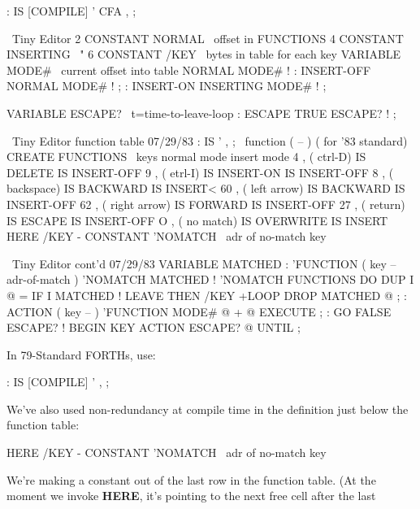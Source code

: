 \begin{Code}
: IS   [COMPILE] '  CFA , ;
\end{Code}
\begin{figure*}[pppp]
\setcounter{screen}{30}
\begin{Screen}
\ Tiny Editor
2 CONSTANT NORMAL     \ offset in FUNCTIONS
4 CONSTANT INSERTING  \        "
6 CONSTANT /KEY       \ bytes in table for each key
VARIABLE MODE#        \ current offset into table
NORMAL MODE# !
: INSERT-OFF   NORMAL    MODE# ! ;
: INSERT-ON    INSERTING MODE# ! ;

VARIABLE ESCAPE?      \ t=time-to-leave-loop
: ESCAPE  TRUE ESCAPE? ! ;
\end{Screen}
\begin{Screen}
\ Tiny Editor             function table             07/29/83
: IS   ' , ;  \   function   ( -- )    ( for '83 standard)
CREATE FUNCTIONS
\ keys                  normal mode        insert mode
 4 ,  ( ctrl-D)         IS DELETE          IS INSERT-OFF
 9 ,  ( etrl-I)         IS INSERT-ON       IS INSERT-OFF
 8 ,  ( backspace)      IS BACKWARD        IS INSERT<
60 ,  ( left arrow)     IS BACKWARD        IS INSERT-OFF
62 ,  ( right arrow)    IS FORWARD         IS INSERT-OFF
27 ,  ( return)         IS ESCAPE          IS INSERT-OFF
 O ,  ( no match)       IS OVERWRITE       IS INSERT
HERE /KEY -  CONSTANT 'NOMATCH  \ adr of no-match key
\end{Screen}
\begin{Screen}
\ Tiny Editor cont'd                                 07/29/83
VARIABLE MATCHED
: 'FUNCTION  ( key -- adr-of-match )  'NOMATCH  MATCHED !
   'NOMATCH FUNCTIONS DO  DUP  I @ =  IF
     I MATCHED !  LEAVE  THEN  /KEY +LOOP  DROP
    MATCHED @ ;
: ACTION  ( key -- )  'FUNCTION  MODE# @ +  @ EXECUTE ;
: GO   FALSE ESCAPE? !  BEGIN  KEY ACTION  ESCAPE? @ UNTIL ;
\end{Screen}
\end{figure*}
In 79-Standard FORTHs, use:
\begin{Code}
: IS   [COMPILE] '  , ;
\end{Code}
We've also used non-redundancy at compile time in the definition just
below the function table:
\begin{Code}
HERE /KEY -  CONSTANT 'NOMATCH  \  adr of no-match key
\end{Code}
We're making a constant out of the last row in the function table. (At the
moment we invoke \textbf{HERE}, it's pointing to the next free cell after the last
